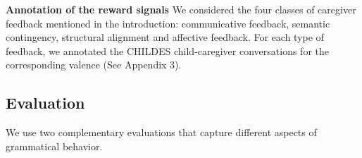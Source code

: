 \noindent \textbf{Annotation of the reward signals}  We considered the four classes of caregiver feedback mentioned in the introduction: communicative feedback, semantic contingency, structural alignment and affective feedback. For each type of feedback, we annotated the CHILDES child-caregiver conversations for the corresponding valence (See Appendix 3).








\subsection{Evaluation}
\label{sec:eval}

We use two complementary evaluations that capture different aspects of grammatical behavior. 

